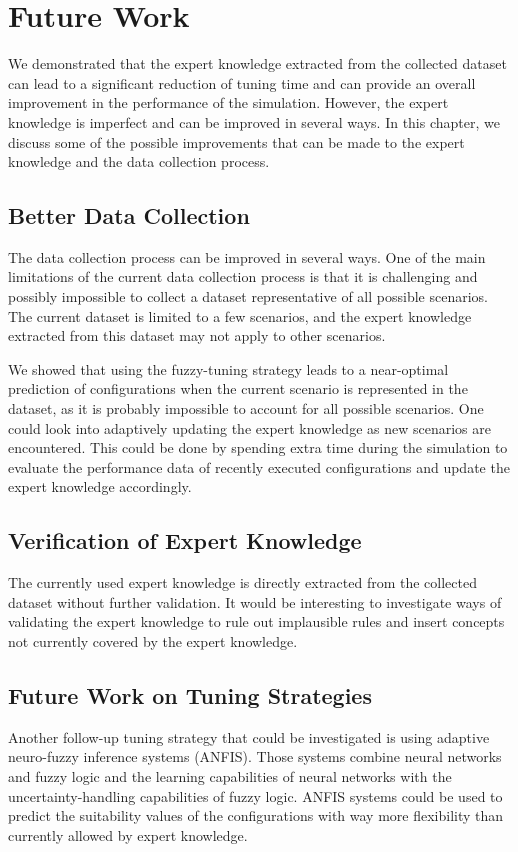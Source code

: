 \chapter{Future Work}
\label{sec:future_work}


We demonstrated that the expert knowledge extracted from the collected dataset can lead to a significant reduction of tuning time and can provide an overall improvement in the performance of the simulation. However, the expert knowledge is imperfect and can be improved in several ways. In this chapter, we discuss some of the possible improvements that can be made to the expert knowledge and the data collection process.

\section{Better Data Collection}

The data collection process can be improved in several ways. One of the main limitations of the current data collection process is that it is challenging and possibly impossible to collect a dataset representative of all possible scenarios. The current dataset is limited to a few scenarios, and the expert knowledge extracted from this dataset may not apply to other scenarios.

We showed that using the fuzzy-tuning strategy leads to a near-optimal prediction of configurations when the current scenario is represented in the dataset, as it is probably impossible to account for all possible scenarios. One could look into adaptively updating the expert knowledge as new scenarios are encountered. This could be done by spending extra time during the simulation to evaluate the performance data of recently executed configurations and update the expert knowledge accordingly.

\section{Verification of Expert Knowledge}

The currently used expert knowledge is directly extracted from the collected dataset without further validation. It would be interesting to investigate ways of validating the expert knowledge to rule out implausible rules and insert concepts not currently covered by the expert knowledge.

\section{Future Work on Tuning Strategies}

Another follow-up tuning strategy that could be investigated is using adaptive neuro-fuzzy inference systems (ANFIS). Those systems combine neural networks and fuzzy logic and the learning capabilities of neural networks with the uncertainty-handling capabilities of fuzzy logic. ANFIS systems could be used to predict the suitability values of the configurations with way more flexibility than currently allowed by expert knowledge.